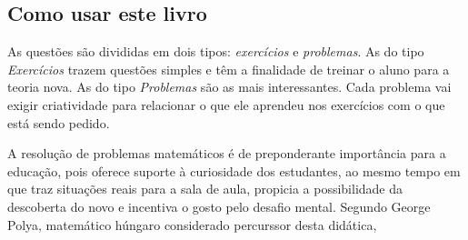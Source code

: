 \documentclass[10pt,a4paper]{report}
\theoremstyle{definition}
\begin{document}
\subsection*{Como usar este livro}
As questões são divididas em dois tipos: \emph{exercícios} e \emph{problemas}. As do tipo \emph{Exercícios} trazem questões simples e têm a finalidade de treinar o aluno para a teoria nova. As do tipo \emph{Problemas} são as mais interessantes. Cada problema vai exigir criatividade para relacionar o que ele aprendeu nos exercícios com o que está sendo pedido.


A resolução de problemas matemáticos é de preponderante importância para a educação, pois oferece suporte à curiosidade dos estudantes, ao mesmo tempo em que traz situações reais para a sala de aula, propicia a possibilidade da descoberta do novo e incentiva o gosto pelo desafio mental. Segundo George Polya, matemático húngaro considerado percurssor desta didática, 
\end{document}
